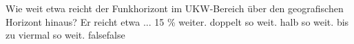     {Wie weit etwa reicht der Funkhorizont im UKW-Bereich über den geografischen Horizont hinaus? Er reicht etwa ...}
    {15 \% weiter.}
    {doppelt so weit.}
    {halb so weit.}
    {bis zu viermal so weit.}
    {false}{false}
